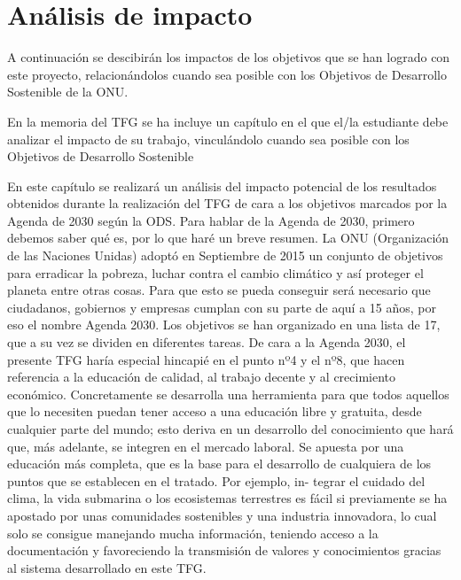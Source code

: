 \chapter{Análisis de impacto}

A continuación se descibirán los impactos de los objetivos que se han logrado con este proyecto, relacionándolos cuando sea posible con los Objetivos de Desarrollo Sostenible de la ONU.





En la memoria del TFG se ha incluye un capítulo en el que el/la estudiante debe analizar el impacto de su trabajo, vinculándolo cuando sea posible con los Objetivos de Desarrollo Sostenible



En este capítulo se realizará un análisis del impacto potencial de los resultados
obtenidos durante la realización del TFG de cara a los objetivos marcados por la
Agenda de 2030 según la ODS.
Para hablar de la Agenda de 2030, primero debemos saber qué es, por lo que
haré un breve resumen.
La ONU (Organización de las Naciones Unidas) adoptó en Septiembre de 2015
un conjunto de objetivos para erradicar la pobreza, luchar contra el cambio
climático y así proteger el planeta entre otras cosas.
Para que esto se pueda conseguir será necesario que ciudadanos, gobiernos y
empresas cumplan con su parte de aquí a 15 años, por eso el nombre Agenda
2030. Los objetivos se han organizado en una lista de 17, que a su vez se dividen
en diferentes tareas.
De cara a la Agenda 2030, el presente TFG haría especial hincapié en el punto
nº4 y el nº8, que hacen referencia a la educación de calidad, al trabajo decente
y al crecimiento económico. Concretamente se desarrolla una herramienta para
que todos aquellos que lo necesiten puedan tener acceso a una educación libre
y gratuita, desde cualquier parte del mundo; esto deriva en un desarrollo del
conocimiento que hará que, más adelante, se integren en el mercado laboral.
Se apuesta por una educación más completa, que es la base para el desarrollo
de cualquiera de los puntos que se establecen en el tratado. Por ejemplo, in-
tegrar el cuidado del clima, la vida submarina o los ecosistemas terrestres es
fácil si previamente se ha apostado por unas comunidades sostenibles y una
industria innovadora, lo cual solo se consigue manejando mucha información,
teniendo acceso a la documentación y favoreciendo la transmisión de valores y
conocimientos gracias al sistema desarrollado en este TFG.

